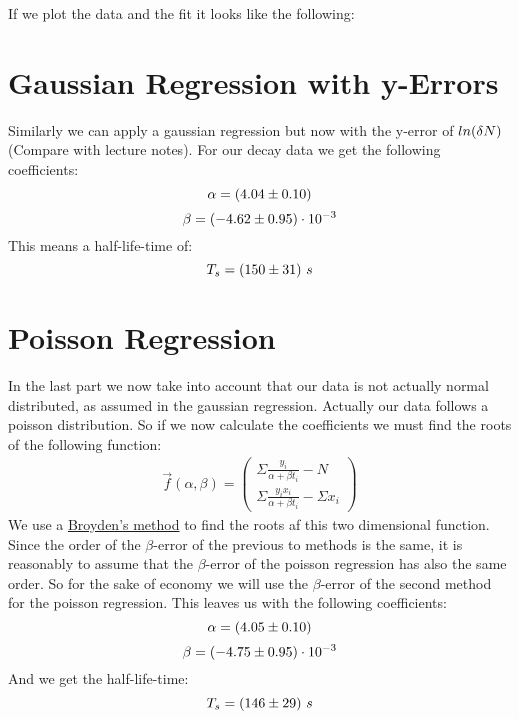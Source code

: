 \documentclass[11pt]{article}
\begin{document}
    If we plot the data and the fit it looks like the following:
    
    \figBaDecay
    
    \pagebreak

    \section{Gaussian Regression with y-Errors}
    Similarly we can apply a gaussian regression but now with the y-error of $ln(\delta N)$ (Compare with lecture notes).
    For our decay data we get the following coefficients:
    \begin{equation*}
        \alpha = (4.04 \pm 0.10)
    \end{equation*}
    \begin{equation*}
        \beta = (-4.62 \pm 0.95) \cdot 10^{-3}
    \end{equation*}
    This means a half-life-time of:
    \begin{equation*}
        T_s = (150 \pm 31)\ s
    \end{equation*}

    \section{Poisson Regression}
    In the last part we now take into account that our data is not actually normal distributed, as assumed in the 
    gaussian regression.
    Actually our data follows a poisson distribution.
    So if we now calculate the coefficients we must find the roots of the following function:
    \begin{align*}
       \vec{f}(\alpha,\beta) = 
        \begin{pmatrix}
            \Sigma \frac{y_i}{\alpha + \beta t_i} - N \\
            \Sigma \frac{y_i x_i}{\alpha + \beta t_i} - \Sigma x_i
        \end{pmatrix}
    \end{align*}
    We use a \href{https://en.wikipedia.org/wiki/Broyden%27s_method}{Broyden's method} to find the roots af this two
    dimensional function. 
    Since the order of the $\beta$-error of the previous to methods is the same, it is
    reasonably to assume that the $\beta$-error of the poisson regression has also the same order.
    So for the sake of economy we will use the $\beta$-error of the second method for the poisson regression.
    This leaves us with the following coefficients:
    \begin{equation*}
        \alpha = (4.05 \pm 0.10)
    \end{equation*}
    \begin{equation*}
        \beta = (-4.75 \pm 0.95) \cdot 10^{-3}
    \end{equation*}
    And we get the half-life-time:
    \begin{equation*}
        T_s = (146 \pm 29)\ s
    \end{equation*}
    
\end{document}
